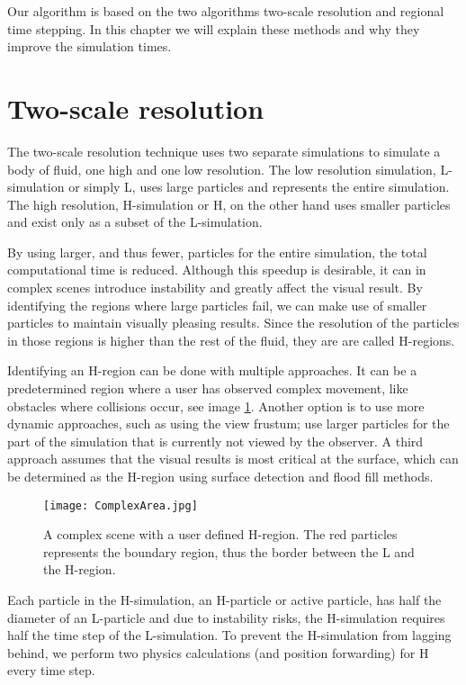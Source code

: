 \documentclass[../../main.tex]{subfiles}
\begin{document}
\tracingall

Our algorithm is based on the two algorithms two-scale resolution and regional time stepping. In this chapter we will explain these methods and why they improve the simulation times. 

\section{Two-scale resolution}
The two-scale resolution technique uses two separate simulations to simulate a body of fluid, one high and one low resolution. The low resolution simulation, L-simulation or simply L, uses large particles and represents the entire simulation. The high resolution, H-simulation or H, on the other hand uses smaller particles and exist only as a subset of the L-simulation. 

By using larger, and thus fewer, particles for the entire simulation, the total computational time is reduced. Although this speedup is desirable, it can in complex scenes introduce instability and greatly affect the visual result. By identifying the regions where large particles fail, we can make use of smaller particles to maintain visually pleasing results. Since the resolution of the particles in those regions is higher than the rest of the fluid, they are are called H-regions.

Identifying an H-region can be done with multiple approaches. It can be a predetermined region where a user has observed complex movement, like obstacles where collisions occur, see image \ref{fig:complexarea}. Another option is to use more dynamic approaches, such as using the view frustum; use larger particles for the part of the simulation that is currently not viewed by the observer. A third approach assumes that the visual results is most critical at the surface, which can be determined as the H-region using surface detection and flood fill methods.

\begin{figure}[h!]
    \centering
    \texttt{[image: ComplexArea.jpg]}
    \caption[Complex scene with user defined H-region]{A complex scene with a user defined H-region. The red particles represents the boundary region, thus the border between the L and the H-region. }
    \label{fig:complexarea}
\end{figure}

Each particle in the H-simulation, an H-particle or active particle, has half the diameter of an L-particle and due to instability risks, the H-simulation requires half the time step of the L-simulation. To prevent the H-simulation from lagging behind, we perform two physics calculations (and position forwarding) for H every time step. 
\end{document}
